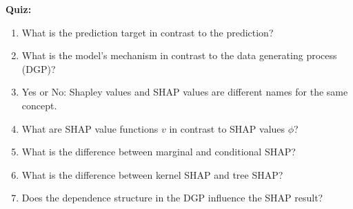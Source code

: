 \textbf{Quiz:}
\begin{enumerate}
    \item What is the prediction target in contrast to the prediction?
    \item What is the model's mechanism in contrast to the data generating process (DGP)?
    \item Yes or No: Shapley values and SHAP values are different names for the same concept.
    \item What are SHAP value functions $v$ in contrast to SHAP values $\phi$?
    \item What is the difference between marginal and conditional SHAP?
    \item What is the difference between kernel SHAP and tree SHAP?
    \item Does the dependence structure in the DGP influence the SHAP result?
\end{enumerate}
